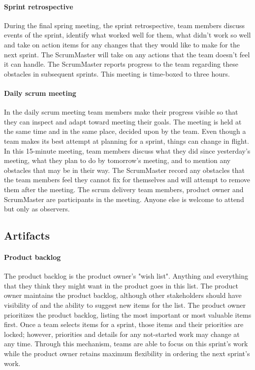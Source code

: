 \paragraph{Sprint retrospective} During the final spring meeting, the sprint retrospective, team members discuss events of the sprint, identify what worked well for them, what didn't work so well and take on action items for any changes that they would like to make for the next sprint. The ScrumMaster will take on any actions that the team doesn't feel it can handle. The ScrumMaster reports progress to the team regarding these obstacles in subsequent sprints. This meeting is time-boxed to three hours.
\paragraph{Daily scrum meeting} In the daily scrum meeting team members make their progress visible so that they can inspect and adapt toward meeting their goals. The meeting is held at the same time and in the same place, decided upon by the team. Even  though a team makes its best attempt at planning for a sprint, things can change in flight. In this 15-minute meeting, team members discuss what they did since yesterday's meeting, what they plan to do by tomorrow's meeting, and to mention any obstacles that may be in their way. The ScrumMaster record any obstacles that the team members feel they cannot fix for themselves and will attempt to remove them after the meeting. The scrum delivery team members, product owner and ScrumMaster are participants in the meeting. Anyone else is welcome to attend but only as observers.
\subsection{Artifacts}
\paragraph{Product backlog} The product backlog is the product owner's "wish list". Anything and everything that they think they might want in the product goes in this list. The product owner maintains the product backlog, although other stakeholders should have visibility of and the ability to suggest new items for the list. The product owner prioritizes the product backlog, listing the most important or most valuable items first. Once a team selects items for a sprint, those items and their priorities are locked; however, priorities and details for any not-started work may change at any time. Through this mechanism, teams are able to focus on this sprint's work while the product owner retains maximum flexibility in ordering the next sprint's work.
